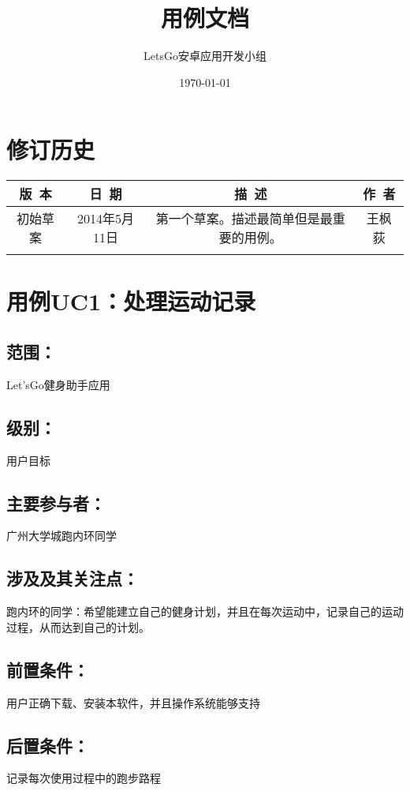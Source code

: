 \documentclass [a4paper,11pt]{article}
\title{用例文档}
\date{\today}
\author{LetsGo安卓应用开发小组}
\begin{document}
	
\maketitle
\section*{修订历史}

\begin{table}[!hbp]
\centering

\begin{tabular*}{\textwidth}{c|c|c|c}
\hline
\rule{0pt}{0.8cm}
版~本 & 日~期 & 描~述 & 作~者\\
\hline
\rule{0pt}{0.6cm}
初始草案 & 2014年5月11日 & 第一个草案。描述最简单但是最重要的用例。 & 王枫荻\\
\hline
\rule{0pt}{0.6cm}
 &  &  & \\
\hline
\end{tabular*}

\end{table}

\section*{用例UC1：处理运动记录}
\subsection*{范围：}Let'sGo健身助手应用
\subsection*{级别：}用户目标
\subsection*{主要参与者：}广州大学城跑内环同学
\subsection*{涉及及其关注点：}
	跑内环的同学：希望能建立自己的健身计划，并且在每次运动中，记录自己的运动过程，从而达到自己的计划。
\subsection*{前置条件：}用户正确下载、安装本软件，并且操作系统能够支持
\subsection*{后置条件：}记录每次使用过程中的跑步路程
\end{document}
